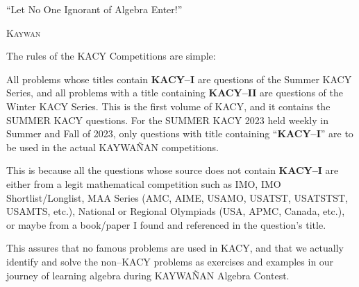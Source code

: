 \documentclass[12pt,a4paper]{memoir}
\theoremstyle{definition}
\begin{document}
	\newpage
	\normalsize
	\tableofcontents\label{TOC}
	
	\normalsize
	\pagestyle{fancy}
	\fancyhf{}

\newpage

	\begin{tcolorbox}
		\begin{displayquote}
			``Let No One Ignorant of Algebra Enter!''
			\begin{flushright}
				\LARGE \textsc{Kaywan}
			\end{flushright}
		\end{displayquote}
	\end{tcolorbox}
	
	
	The rules of the KACY Competitions are simple: 
	\begin{idea}
		\begin{tasks}
			\task All problems whose titles contain \textbf{KACY--I} are questions of the Summer KACY Series, and all problems with a title containing \textbf{KACY--II} are questions of the Winter KACY Series.
			\task This is the first volume of KACY, and it contains the SUMMER KACY questions. For the SUMMER KACY 2023 held weekly in Summer and Fall of 2023, only questions with title containing ``\textbf{KACY--I}'' are to be used in the actual KAYWAÑAN competitions.
		\end{tasks}
	\end{idea}
	
	\vspace{0.5em}
	
	This is because all the questions whose source does not contain \textbf{KACY--I} are either from a legit mathematical competition such as IMO, IMO Shortlist/Longlist, MAA Series (AMC, AIME, USAMO, USATST, USATSTST, USAMTS, etc.), National or Regional Olympiads (USA, APMC, Canada, etc.), or maybe from a book/paper I found and referenced in the question's title. 
	
	\vspace{0.5em}
	
	This assures that no famous problems are used in KACY, and that we actually identify and solve the non--KACY problems as exercises and examples in our journey of learning algebra during KAYWAÑAN Algebra Contest.
	
\end{document}
